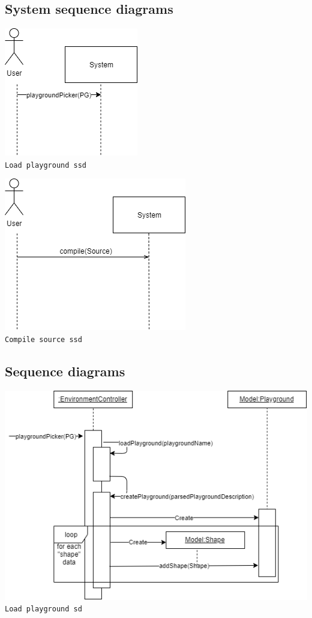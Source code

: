 \documentclass{scrartcl}
\begin{document}
\subsection{System sequence diagrams}

\begin{center}
  \includegraphics[scale=0.7]{./loadPlayground_ssd} \\
  \texttt{Load playground ssd}
\end{center}

\begin{center}
  \includegraphics[scale=0.7]{./compiler_ssd} \\
  \texttt{Compile source ssd}
\end{center}

\subsection{Sequence diagrams}

\begin{center}
  \includegraphics[scale=0.7]{./loadPlayground_sd} \\
  \texttt{Load playground sd}
\end{center}
\end{document}
